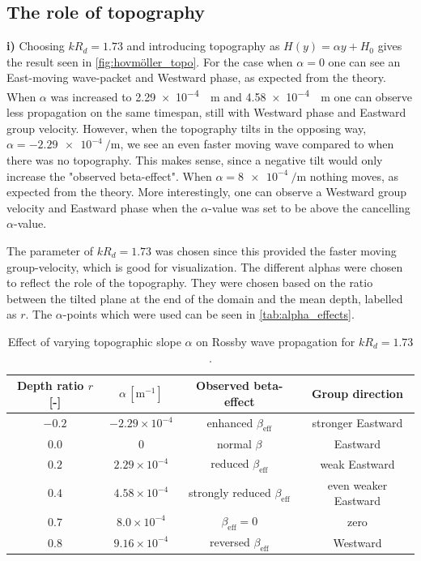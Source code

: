 \newpage
\subsection{The role of topography}

\textbf{i)} Choosing $kR_d=1.73$ and introducing topography as $H(y)=\alpha y + H_0$ gives the result seen in \autoref{fig:hovmöller_topo}. For the case when $\alpha=0$ one can see an East-moving wave-packet and Westward phase, as expected from the theory. When $\alpha$ was increased to \SI{2.29e-4}{\per\meter} and \SI{4.58e-4}{\per\meter} one can observe less propagation on the same timespan, still with Westward phase and Eastward group velocity. However, when the topography tilts in the opposing way, $\alpha=\SI{-2.29e-4}{\per\meter}$, we see an even faster moving wave compared to when there was no topography. This makes sense, since a negative tilt would only increase the "observed beta-effect". When $\alpha=\SI{8e-4}{\per\meter}$ nothing moves, as expected from the theory. More interestingly, one can observe a Westward group velocity and Eastward phase when the $\alpha$-value was set to be above the cancelling $\alpha$-value.

The parameter of $kR_d=1.73$ was chosen since this provided the faster moving group-velocity, which is good for visualization. The different alphas were chosen to reflect the role of the topography. They were chosen based on the ratio between the tilted plane at the end of the domain and the mean depth, labelled as $r$. The $\alpha$-points which were used can be seen in \autoref{tab:alpha_effects}.
\begin{table}[H]
\centering
\begin{tabular}{c c c c}
\hline
Depth ratio $r$ [-] & $\alpha\,[\mathrm{m^{-1}}]$ & Observed beta-effect & Group direction \\
\hline
$-0.2$ & $-2.29\times10^{-4}$ & enhanced $\beta_\text{eff}$ & stronger Eastward \\
$0.0$ & $0$ & normal $\beta$ & Eastward \\
$0.2$ & $2.29\times10^{-4}$ & reduced $\beta_\text{eff}$ & weak Eastward \\
$0.4$ & $4.58\times10^{-4}$ & strongly reduced $\beta_\text{eff}$ & even weaker Eastward \\
$0.7$ & $8.0\times10^{-4}$ & $\beta_\text{eff}=0$ & zero \\
$0.8$ & $9.16\times10^{-4}$ & reversed $\beta_\text{eff}$ & Westward \\
\hline
\end{tabular}
\caption{Effect of varying topographic slope $\alpha$ on Rossby wave propagation for $kR_d=1.73$. }
\label{tab:alpha_effects}
\end{table}

